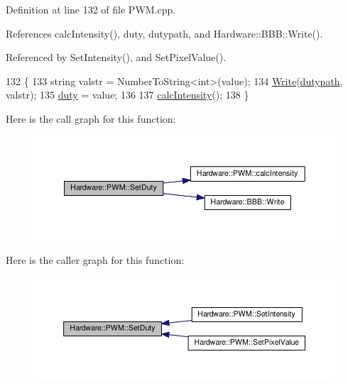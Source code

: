 Definition at line 132 of file P\+W\+M.\+cpp.



References calc\+Intensity(), duty, dutypath, and Hardware\+::\+B\+B\+B\+::\+Write().



Referenced by Set\+Intensity(), and Set\+Pixel\+Value().


\begin{DoxyCode}
132                            \{
133   \textcolor{keywordtype}{string} valstr = NumberToString<int>(value);
134   \hyperlink{class_hardware_1_1_b_b_b_a155cc06f76d82a6b690ce5ea08e7c68e}{Write}(\hyperlink{class_hardware_1_1_p_w_m_a53311e9df6960751465d5f0b81192226}{dutypath}, valstr);
135   \hyperlink{class_hardware_1_1_p_w_m_a3309b2645c4c817384d91f33f0df5d64}{duty} = value;
136 
137   \hyperlink{class_hardware_1_1_p_w_m_a891abdbbd00aae4f0a4afdf0a9e3a160}{calcIntensity}();
138 \}
\end{DoxyCode}


Here is the call graph for this function\+:\nopagebreak
\begin{figure}[H]
\begin{center}
\leavevmode
\includegraphics[width=350pt]{class_hardware_1_1_p_w_m_a93ea3627da17bf143ac548cbd623d13d_cgraph}
\end{center}
\end{figure}




Here is the caller graph for this function\+:\nopagebreak
\begin{figure}[H]
\begin{center}
\leavevmode
\includegraphics[width=350pt]{class_hardware_1_1_p_w_m_a93ea3627da17bf143ac548cbd623d13d_icgraph}
\end{center}
\end{figure}



